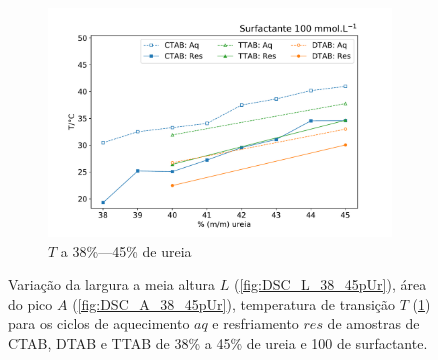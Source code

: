 \begin{figure}[H]
		\begin{subfigure}[t]{0.60\textwidth}
			\includegraphics[width=\textwidth]{./imagens/dsc/T_100mM_aq_res}
			\caption{$T$ a 38\%---45\% de ureia}
			\label{fig:DSC_T_38_45pUr}
		\end{subfigure}
		
		\caption{Variação da largura a meia altura $L$ (\ref{fig:DSC_L_38_45pUr}), área do pico $A$ (\ref{fig:DSC_A_38_45pUr}), temperatura de transição $T$ (\ref{fig:DSC_T_38_45pUr}) para os ciclos de aquecimento $aq$ e resfriamento $res$ de amostras de CTAB, DTAB e TTAB de 38\% a 45\% de ureia e 100 \mM{} de surfactante.}
		\label{fig:DSC_propriedades_Ur_38_45}
	\end{figure}
		
